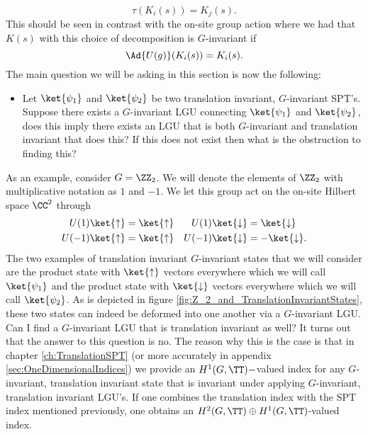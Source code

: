 \begin{equation}
\tau(K_i(s))=K_j(s).
\end{equation}
This should be seen in contrast with the on-site group action where we had that $K(s)$ with this choice of decomposition is $G$-invariant if
\begin{equation}
\Ad{U(g)}(K_i(s))=K_i(s).
\end{equation}
The main question we will be asking in this section is now the following:
\begin{itemize}
	\item Let $\ket{\psi_1}$ and $\ket{\psi_2}$ be two translation invariant, $G$-invariant SPT's. Suppose there exists a $G$-invariant LGU connecting $\ket{\psi_1}$ and $\ket{\psi_2}$, does this imply there exists an LGU that is both $G$-invariant and translation invariant that does this? If this does not exist then what is the obstruction to finding this?
\end{itemize}
As an example, consider $G=\ZZ_2$. We will denote the elements of $\ZZ_2$ with multiplicative notation as $1$ and $-1$. We let this group act on the on-site Hilbert space $\CC^2$ through
\begin{align}
U(1)\ket{\uparrow}&=\ket{\uparrow}&U(1)\ket{\downarrow}&=\ket{\downarrow}\\
U(-1)\ket{\uparrow}&=\ket{\uparrow}&U(-1)\ket{\downarrow}&=-\ket{\downarrow}.
\end{align}
The two examples of translation invariant $G$-invariant states that we will consider are the product state with $\ket{\uparrow}$ vectors everywhere which we will call $\ket{\psi_1}$ and the product state with $\ket{\downarrow}$ vectors everywhere which we will call $\ket{\psi_2}$. As is depicted in figure \ref{fig:Z_2_and_TranslationInvariantStates}, these two states can indeed be deformed into one another via a $G$-invariant LGU. Can I find a $G$-invariant LGU that is translation invariant as well? It turns out that the answer to this question is no. The reason why this is the case is that in chapter \ref{ch:TranslationSPT} (or more accurately in appendix \ref{sec:OneDimensionalIndices}) we provide an $H^1(G,\TT)-$valued index for any $G$-invariant, translation invariant state that is invariant under applying $G$-invariant, translation invariant LGU's. If one combines the translation index with the SPT index mentioned previously, one obtains an $H^2(G,\TT)\oplus H^1(G,\TT)$-valued index.

